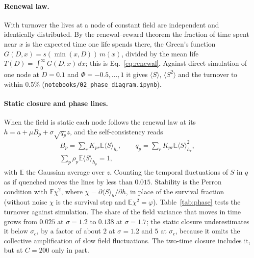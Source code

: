 \documentclass[pre,twocolumn,superscriptaddress,nofootinbib]{revtex4-2}
\newcommand{\E}{\mathbb E}
\begin{document}
\paragraph{Renewal law.}  With turnover the lives at a node of constant field are independent and
identically distributed.  By the renewal--reward theorem the fraction of time spent near $x$ is the
expected time one life spends there, the Green's function $G(D,x)=s(\min(x,D))\,m(x)$, divided by the
mean life $T(D)=\int_0^\infty G(D,x)\,dx$; this is Eq.~\eqref{eq:renewal}.  Against direct
simulation of one node at $D=0.1$ and $\Phi=-0.5,\dots,1$ it gives $\langle S\rangle$, $\langle S^2\rangle$ and the
turnover to within $0.5\%$ (\texttt{notebooks/02\_phase\_diagram.ipynb}).

\paragraph{Static closure and phase lines.}  When the field is static each node follows the renewal
law at its $h=a+\mu B_p+\sigma\sqrt{q_p}z$, and the self-consistency reads
\begin{gather}
B_p=\sum_rK_{pr}\E\langle S\rangle_{h_r},\qquad q_p=\sum_rK_{pr}\E\langle S\rangle_{h_r}^2,\nonumber\\
\sum_p\rho_p\E\langle S\rangle_{h_p}=1,
\end{gather}
with $\E$ the Gaussian average over $z$.  Counting the temporal fluctuations of $S$ in $q$ as if
quenched moves the lines by less than $0.015$.  Stability is the Perron condition with $\E\chi^2$, where
$\chi=\partial\langle S\rangle_h/\partial h$, in place of the survival fraction (without noise $\chi$ is the
survival step and $\E\chi^2=\varphi$).  Table~\ref{tab:phase} tests the
turnover against simulation.  The share of the field variance that moves in time grows from $0.025$
at $\sigma=1.2$ to $0.138$ at $\sigma=1.7$; the static closure underestimates it below $\sigma_c$, by a factor
of about $2$ at $\sigma=1.2$ and $5$ at $\sigma_c$, because it omits the collective amplification of slow field
fluctuations.  The two-time closure includes it, but at $C=200$ only in part.
\end{document}
